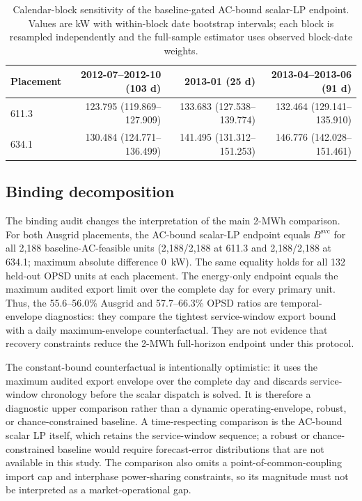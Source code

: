 \documentclass[11pt]{article}
\begin{document}
\begin{table}[t]
\centering
\caption{Calendar-block sensitivity of the baseline-gated AC-bound scalar-LP endpoint. Values are kW with within-block date bootstrap intervals; each block is resampled independently and the full-sample estimator uses observed block-date weights.}
\label{tab:blockstats}
\small
\begin{tabular}{lrrr}
\toprule
Placement & 2012-07--2012-10 (103 d) & 2013-01 (25 d) & 2013-04--2013-06 (91 d)\\
\midrule
611.3 & 123.795 (119.869--127.909) & 133.683 (127.538--139.774) & 132.464 (129.141--135.910)\\
634.1 & 130.484 (124.771--136.499) & 141.495 (131.312--151.253) & 146.776 (142.028--151.461)\\
\bottomrule
\end{tabular}
\end{table}

\subsection{Binding decomposition}
The binding audit changes the interpretation of the main 2-MWh comparison. For both Ausgrid placements, the AC-bound scalar-LP endpoint equals $B^{\mathrm{svc}}$ for all 2,188 baseline-AC-feasible units (2,188/2,188 at 611.3 and 2,188/2,188 at 634.1; maximum absolute difference 0~kW). The same equality holds for all 132 held-out OPSD units at each placement. The energy-only endpoint equals the maximum audited export limit over the complete day for every primary unit. Thus, the 55.6--56.0\% Ausgrid and 57.7--66.3\% OPSD ratios are temporal-envelope diagnostics: they compare the tightest service-window export bound with a daily maximum-envelope counterfactual. They are not evidence that recovery constraints reduce the 2-MWh full-horizon endpoint under this protocol.

The constant-bound counterfactual is intentionally optimistic: it uses the maximum audited export envelope over the complete day and discards service-window chronology before the scalar dispatch is solved. It is therefore a diagnostic upper comparison rather than a dynamic operating-envelope, robust, or chance-constrained baseline. A time-respecting comparison is the AC-bound scalar LP itself, which retains the service-window sequence; a robust or chance-constrained baseline would require forecast-error distributions that are not available in this study. The comparison also omits a point-of-common-coupling import cap and interphase power-sharing constraints, so its magnitude must not be interpreted as a market-operational gap.
\end{document}
